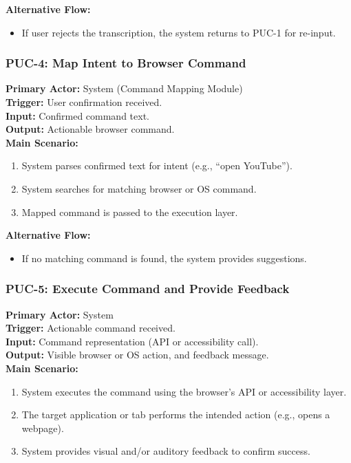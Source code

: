 \documentclass[12pt]{article}
\begin{document}
\textbf{Alternative Flow:}
\begin{itemize}
  \item If user rejects the transcription, the system returns to PUC-1 for re-input.
\end{itemize}

\bigskip

\subsubsection*{PUC-4: Map Intent to Browser Command}
\textbf{Primary Actor:} System (Command Mapping Module) \\
\textbf{Trigger:} User confirmation received. \\
\textbf{Input:} Confirmed command text. \\
\textbf{Output:} Actionable browser command. \\

\textbf{Main Scenario:}
\begin{enumerate}
  \item System parses confirmed text for intent (e.g., “open YouTube”).
  \item System searches for matching browser or OS command.
  \item Mapped command is passed to the execution layer.
\end{enumerate}

\textbf{Alternative Flow:}
\begin{itemize}
  \item If no matching command is found, the system provides suggestions.
\end{itemize}

\bigskip

\subsubsection*{PUC-5: Execute Command and Provide Feedback}
\textbf{Primary Actor:} System \\
\textbf{Trigger:} Actionable command received. \\
\textbf{Input:} Command representation (API or accessibility call). \\
\textbf{Output:} Visible browser or OS action, and feedback message. \\

\textbf{Main Scenario:}
\begin{enumerate}
  \item System executes the command using the browser’s API or accessibility layer.
  \item The target application or tab performs the intended action (e.g., opens a webpage).
  \item System provides visual and/or auditory feedback to confirm success.
\end{enumerate}
\end{document}
